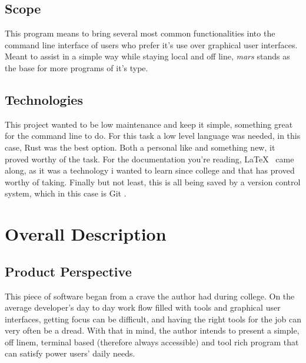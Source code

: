 \documentclass{report}
\begin{document}
\section{Scope}
This program means to bring several most common functionalities into the command line interface of users who prefer it's use over graphical user interfaces. Meant to assist in a simple way while staying local and off line, \emph{mars} stands as the base for more programs of it's type.

\section{Technologies}
This project wanted to be low maintenance and keep it simple, something great for the command line to do. For this task a low level language was needed, in this case, Rust \cite{RustProgrammingLanguage} was the best option. Both a personal like and something new, it proved worthy of the task. For the documentation you're reading, \LaTeX\ \cite{LaTeXDocumentPreparation} came along, as it was a technology i wanted to learn since college and that  has proved worthy of taking. Finally but not least, this is all being saved by a version control system, which in this case is Git \cite{Git}.

\chapter{Overall Description}
\section{Product Perspective}
This piece of software began from a crave the author had during college. On the average developer's day to day work flow filled with tools and graphical user interfaces, getting focus can be difficult, and having the right tools for the job can very often be a dread. With that in mind, the author intends to present a simple, off linem, terminal based (therefore always accessible) and tool rich program that can satisfy power users' daily needs.
\end{document}
